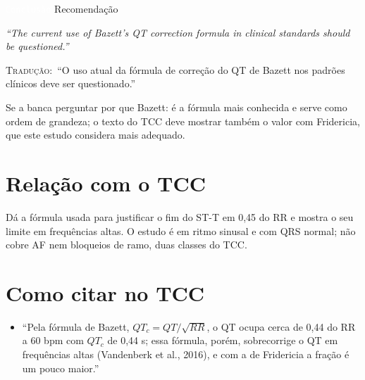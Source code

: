 \documentclass[11pt,a4paper]{article}
\newcommand{\pagechip}[1]{{\setlength{\fboxsep}{1.5pt}\colorbox{cAcc}{\textcolor{white}{\scriptsize\texttt{#1}}}}}
\newenvironment{origquote}{\par\itshape\small}{\par}
\newenvironment{tradquote}{\par\small\textsc{Tradução:}\ }{\par}
\newcommand{\explab}[1]{\par\smallskip{\small\color{cAcc}\textbf{\MakeUppercase{#1}}}\par}
\begin{document}
\begin{citacard}{\pagechip{Conclusão} Recomendação}
\begin{origquote}“The current use of Bazett's QT correction formula in clinical standards should be questioned.”\end{origquote}
\begin{tradquote}“O uso atual da fórmula de correção do QT de Bazett nos padrões clínicos deve ser questionado.”\end{tradquote}
\explab{Explicação}
Se a banca perguntar por que Bazett: é a fórmula mais conhecida e serve como ordem de grandeza; o texto do TCC deve mostrar também o valor com Fridericia, que este estudo considera mais adequado.
\end{citacard}

\section{Relação com o TCC}
Dá a fórmula usada para justificar o fim do ST-T em 0,45 do RR e mostra o seu limite em frequências altas. O estudo é em ritmo sinusal e com QRS normal; não cobre AF nem bloqueios de ramo, duas classes do TCC.

\section{Como citar no TCC}
\begin{itemize}
\item ``Pela fórmula de Bazett, $QT_c = QT/\sqrt{RR}$, o QT ocupa cerca de 0,44 do RR a 60 bpm com $QT_c$ de 0,44 s; essa fórmula, porém, sobrecorrige o QT em frequências altas (Vandenberk et al., 2016), e com a de Fridericia a fração é um pouco maior.''
\end{itemize}
\end{document}
